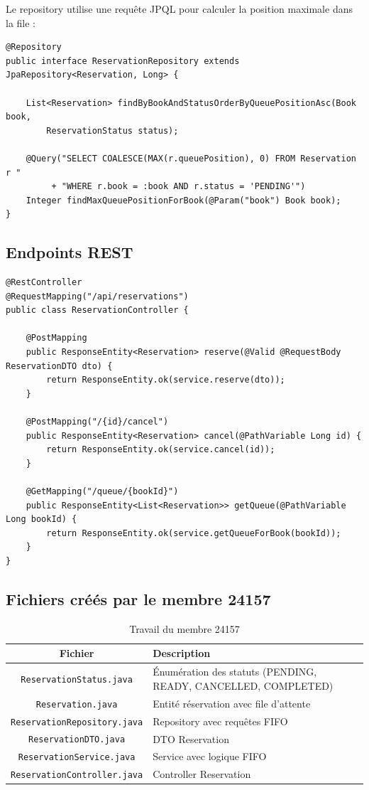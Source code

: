 \documentclass[12pt,a4paper,twoside]{report}
\begin{document}
Le repository utilise une requête JPQL pour calculer la position maximale dans la file :

\begin{lstlisting}[caption=ReservationRepository]
@Repository
public interface ReservationRepository extends JpaRepository<Reservation, Long> {

    List<Reservation> findByBookAndStatusOrderByQueuePositionAsc(Book book,
        ReservationStatus status);

    @Query("SELECT COALESCE(MAX(r.queuePosition), 0) FROM Reservation r "
         + "WHERE r.book = :book AND r.status = 'PENDING'")
    Integer findMaxQueuePositionForBook(@Param("book") Book book);
}
\end{lstlisting}

\subsection{Endpoints REST}

\begin{lstlisting}[caption=ReservationController]
@RestController
@RequestMapping("/api/reservations")
public class ReservationController {

    @PostMapping
    public ResponseEntity<Reservation> reserve(@Valid @RequestBody ReservationDTO dto) {
        return ResponseEntity.ok(service.reserve(dto));
    }

    @PostMapping("/{id}/cancel")
    public ResponseEntity<Reservation> cancel(@PathVariable Long id) {
        return ResponseEntity.ok(service.cancel(id));
    }

    @GetMapping("/queue/{bookId}")
    public ResponseEntity<List<Reservation>> getQueue(@PathVariable Long bookId) {
        return ResponseEntity.ok(service.getQueueForBook(bookId));
    }
}
\end{lstlisting}

\subsection{Fichiers créés par le membre 24157}

\begin{table}[H]
\centering
\caption{Travail du membre 24157}
\begin{tabularx}{\textwidth}{c X}
\hline
\rowcolor[gray]{0.9}
\textbf{Fichier} & \textbf{Description} \\
\hline
\texttt{ReservationStatus.java} & Énumération des statuts (PENDING, READY, CANCELLED, COMPLETED) \\
\texttt{Reservation.java} & Entité réservation avec file d'attente \\
\texttt{ReservationRepository.java} & Repository avec requêtes FIFO \\
\texttt{ReservationDTO.java} & DTO Reservation \\
\texttt{ReservationService.java} & Service avec logique FIFO \\
\texttt{ReservationController.java} & Controller Reservation \\
\hline
\end{tabularx}
\end{table}
\end{document}
